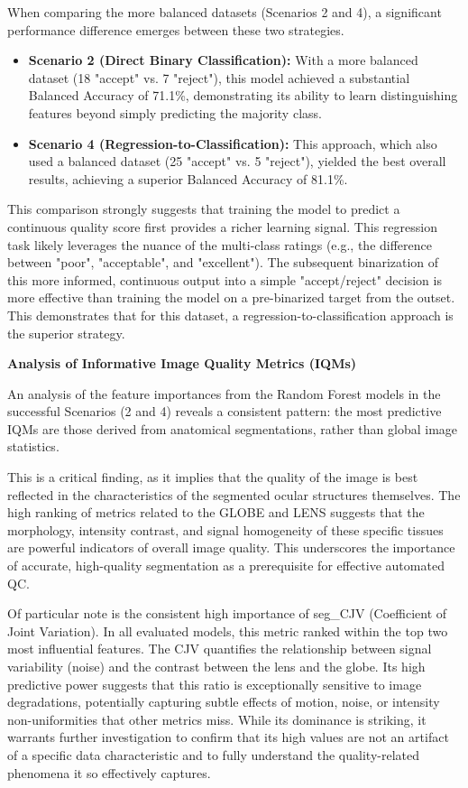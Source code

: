 When comparing the more balanced datasets (Scenarios 2 and 4), a significant performance difference emerges between these two strategies.
\begin{itemize}
    \item \textbf{Scenario 2 (Direct Binary Classification):} With a more balanced dataset (18 "accept" vs. 7 "reject"), this model achieved a substantial Balanced Accuracy of 71.1\%, demonstrating its ability to learn distinguishing features beyond simply predicting the majority class.
    \item \textbf{Scenario 4 (Regression-to-Classification):} This approach, which also used a balanced dataset (25 "accept" vs. 5 "reject"), yielded the best overall results, achieving a superior Balanced Accuracy of 81.1\%.

\end{itemize}
This comparison strongly suggests that training the model to predict a continuous quality score first provides a richer learning signal. This regression task likely leverages the nuance of the multi-class ratings (e.g., the difference between "poor", "acceptable", and "excellent"). The subsequent binarization of this more informed, continuous output into a simple "accept/reject" decision is more effective than training the model on a pre-binarized target from the outset. This demonstrates that for this dataset, a regression-to-classification approach is the superior strategy.

\textbf{Analysis of Informative Image Quality Metrics (IQMs)}

An analysis of the feature importances from the Random Forest models in the successful Scenarios (2 and 4) reveals a consistent pattern: the most predictive IQMs are those derived from anatomical segmentations, rather than global image statistics.

This is a critical finding, as it implies that the quality of the image is best reflected in the characteristics of the segmented ocular structures themselves. The high ranking of metrics related to the GLOBE and LENS suggests that the morphology, intensity contrast, and signal homogeneity of these specific tissues are powerful indicators of overall image quality. This underscores the importance of accurate, high-quality segmentation as a prerequisite for effective automated QC.

Of particular note is the consistent high importance of seg\_CJV (Coefficient of Joint Variation). In all evaluated models, this metric ranked within the top two most influential features. The CJV quantifies the relationship between signal variability (noise) and the contrast between the lens and the globe. Its high predictive power suggests that this ratio is exceptionally sensitive to image degradations, potentially capturing subtle effects of motion, noise, or intensity non-uniformities that other metrics miss. While its dominance is striking, it warrants further investigation to confirm that its high values are not an artifact of a specific data characteristic and to fully understand the quality-related phenomena it so effectively captures.

